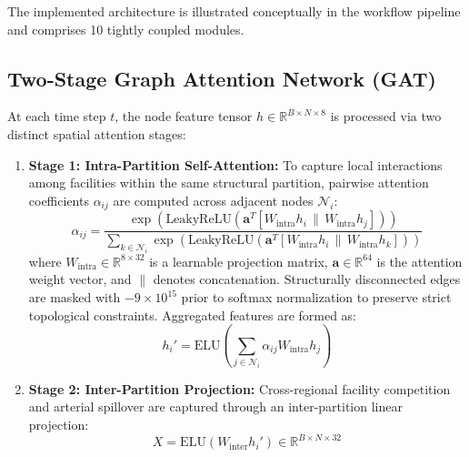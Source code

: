 \documentclass[journal]{IEEEtran}
\begin{document}
The implemented architecture is illustrated conceptually in the workflow pipeline and comprises 10 tightly coupled modules.

\subsection{Two-Stage Graph Attention Network (GAT)}
At each time step $t$, the node feature tensor $h \in \mathbb{R}^{B \times N \times 8}$ is processed via two distinct spatial attention stages:
\begin{enumerate}
    \item \textbf{Stage 1: Intra-Partition Self-Attention:} To capture local interactions among facilities within the same structural partition, pairwise attention coefficients $\alpha_{ij}$ are computed across adjacent nodes $\mathcal{N}_i$:
    \begin{equation}
    \alpha_{ij} = \frac{\exp\left(\text{LeakyReLU}\left(\mathbf{a}^T [W_{\text{intra}} h_i \,\|\, W_{\text{intra}} h_j]\right)\right)}{\sum_{k \in \mathcal{N}_i} \exp\left(\text{LeakyReLU}\left(\mathbf{a}^T [W_{\text{intra}} h_i \,\|\, W_{\text{intra}} h_k]\right)\right)}
    \label{eq:gat_alpha}
    \end{equation}
    where $W_{\text{intra}} \in \mathbb{R}^{8 \times 32}$ is a learnable projection matrix, $\mathbf{a} \in \mathbb{R}^{64}$ is the attention weight vector, and $\|$ denotes concatenation. Structurally disconnected edges are masked with $-9 \times 10^{15}$ prior to softmax normalization to preserve strict topological constraints. Aggregated features are formed as:
    \begin{equation}
    h_i' = \text{ELU}\left(\sum_{j \in \mathcal{N}_i} \alpha_{ij} W_{\text{intra}} h_j\right)
    \end{equation}
    \item \textbf{Stage 2: Inter-Partition Projection:} Cross-regional facility competition and arterial spillover are captured through an inter-partition linear projection:
    \begin{equation}
    X = \text{ELU}(W_{\text{inter}} h_i') \in \mathbb{R}^{B \times N \times 32}
    \end{equation}
\end{enumerate}
\end{document}
